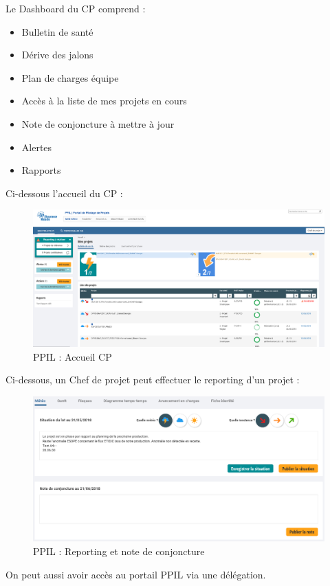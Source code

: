 Le Dashboard du CP comprend :

\begin{itemize}
    \item Bulletin de santé
    \item Dérive des jalons
    \item Plan de charges équipe
    \item Accès à la liste de mes projets en cours
    \item Note de conjoncture à mettre à jour
    \item Alertes
    \item Rapports
\end{itemize}

Ci-dessous l'accueil du CP :

\begin{figure}[!h]
\centering
\includegraphics[width=1\textwidth]{images/ppil-CP.PNG}
\caption{PPIL : Accueil CP}
\end{figure}

Ci-dessous, un Chef de projet peut effectuer le reporting d'un projet :

\begin{figure}[!h]
\centering
\includegraphics[width=1\textwidth]{images/ppil-meteo.PNG}
\caption{PPIL : Reporting et note de conjoncture}
\end{figure}

On peut aussi avoir accès au portail PPIL via une délégation.

